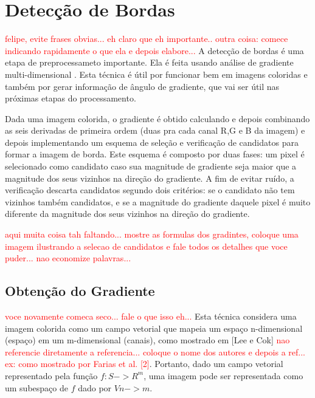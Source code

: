 \section{Detecção de Bordas}

\textcolor{red}{felipe, evite frases obvias... eh claro que eh importante.. outra coisa: comece indicando rapidamente o que ela e depois elabore...}
A detecção de bordas é uma etapa de preprocessameto importante. Ela é feita usando análise de gradiente multi-dimensional \cite{borda00}. Esta técnica é útil por funcionar bem em imagens coloridas e também por gerar informação de ângulo de gradiente, que vai ser útil nas próximas etapas do processamento.

Dada uma imagem colorida, o gradiente é obtido calculando e depois combinando as seis derivadas de primeira ordem (duas pra cada canal R,G e B da imagem) e depois implementando um esquema de seleção e verificação de candidatos para formar a imagem de borda. Este esquema é composto por duas fases: um pixel é selecionado como candidato caso sua magnitude de gradiente seja maior que a magnitude dos seus vizinhos na direção do gradiente. A fim de evitar ruído, a verificação descarta candidatos segundo dois critérios: se o candidato não tem vizinhos também candidatos, e se a magnitude do gradiente daquele pixel é muito diferente da magnitude dos seus vizinhos na direção do gradiente.

\textcolor{red}{aqui muita coisa tah faltando... mostre as formulas dos gradintes, coloque uma imagem ilustrando a selecao de candidatos e fale todos os detalhes que voce puder... nao economize palavras...}



\subsection{Obtenção do Gradiente}

\textcolor{red}{voce novamente comeca seco... fale o que isso eh...}
Esta técnica considera uma imagem colorida como um campo vetorial que mapeia um espaço n-dimensional (espaço) em um m-dimensional (canais), como mostrado em [Lee e Cok] \textcolor{red}{nao referencie diretamente a referencia... coloque o nome dos autores e depois a ref... ex: como mostrado por Farias et al. [2]}. Portanto, dado um campo vetorial representado pela função $ f: S->R^m $, uma imagem pode ser representada como um subespaço de $f$ dado por $ Vn->m $.

